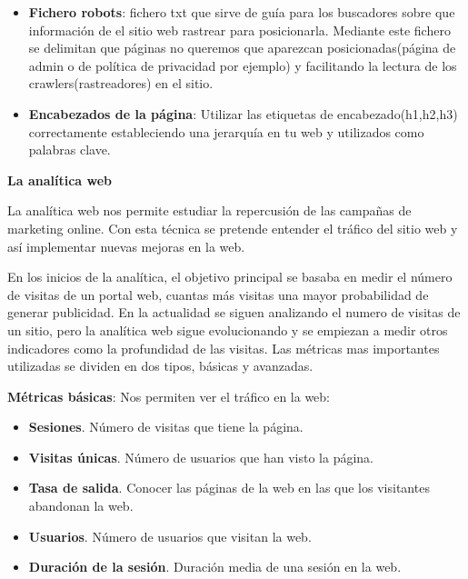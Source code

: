 \begin{itemize}
\item \textbf{Fichero robots}: fichero txt que sirve de guía para los buscadores sobre que información de el sitio web rastrear para posicionarla. Mediante este fichero se delimitan que páginas no queremos que aparezcan posicionadas(página de admin o de política de privacidad por ejemplo) y facilitando la lectura de los crawlers(rastreadores) en el sitio.

\item \textbf{Encabezados de la página}: Utilizar las etiquetas de encabezado(h1,h2,h3) correctamente estableciendo una jerarquía en tu web y utilizados como palabras clave.  


\end{itemize}

\vspace{5 mm}

\textbf{La analítica web}

\vspace{5 mm}

La analítica web nos permite estudiar la repercusión de las campañas de marketing online. Con esta técnica se pretende entender el tráfico del sitio web y así implementar nuevas mejoras en la web.

\vspace{5 mm}

En los inicios de la analítica, el objetivo principal se basaba en medir el número de visitas de un portal web, cuantas más visitas una mayor probabilidad de generar publicidad. En la actualidad se siguen analizando el numero de visitas de un sitio, pero la analítica web sigue evolucionando y se empiezan a medir otros indicadores como la profundidad de las visitas. Las métricas mas importantes utilizadas se dividen en dos tipos, básicas y avanzadas.


\textbf{Métricas básicas}: Nos permiten ver el tráfico en la web: 

\begin{itemize}

\item \textbf{Sesiones}. Número de visitas que tiene la página.

\item \textbf{Visitas únicas}. Número de usuarios que han visto la página.

\item \textbf{Tasa de salida}. Conocer las páginas de la web en las que los visitantes abandonan la web.

\item \textbf{Usuarios}. Número de usuarios que visitan la web. 

\item \textbf{Duración de la sesión}. Duración media de una sesión en la web.

\end{itemize}

